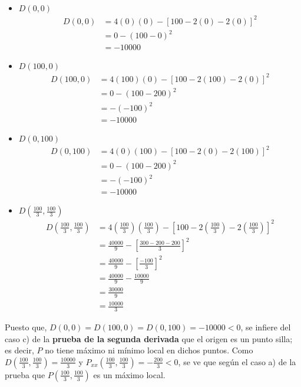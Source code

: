 \documentclass[12pt]{article}
\begin{document}
\begin{itemize}
  
\item $D(0,0)$
  \begin{align*}
    D(0,0)
    &= 4(0)(0)-[100-2(0)-2(0)]^2 \\
    &= 0 - (100-0)^2\\
    &= -10000
  \end{align*}
  
\item $D(100,0)$
  \begin{align*}
    D(100,0)
    &= 4(100)(0)-[100-2(100)-2(0)]^2 \\
    &= 0 - (100-200)^2\\
    &= -(-100)^2\\
    &= -10000
  \end{align*}
  
\item $D(0,100)$
  \begin{align*}
    D(0,100)
    &= 4(0)(100)-[100-2(0)-2(100)]^2 \\
    &= 0 - (100-200)^2\\
    &= -(-100)^2\\
    &= -10000
  \end{align*}
  
\item $D\left(\frac{100}{3},\frac{100}{3}\right)$
  \begin{align*}
    D\left(\frac{100}{3},\frac{100}{3}\right)
    &= 4\left(\frac{100}{3}\right)\left(\frac{100}{3}\right)-\left[100-2\left(\frac{100}{3}\right)-2\left(\frac{100}{3}\right)\right]^2 \\
    &= \frac{40000}{9} - \left[ \frac{300-200-200}{3} \right]^2\\
    &= \frac{40000}{9} - \left[ \frac{-100}{3} \right]^2\\
    &= \frac{40000}{9} - \frac{10000}{9}\\
    &= \frac{30000}{9} \\
    &= \frac{10000}{3}
  \end{align*}
  
\end{itemize}

Puesto que, $D(0,0)= D(100,0) = D(0,100) = -10000 < 0$, se infiere del caso c) de la \textbf{prueba de la segunda derivada} que el origen es un punto silla; es decir, $P$ no tiene máximo ni mínimo local en dichos puntos. Como $D\left(\frac{100}{3},\frac{100}{3}\right)=\frac{10000}{3}$ y $P_{xx}\left(\frac{100}{3},\frac{100}{3}\right)=-\frac{200}{3}<0$, se ve que según el caso a) de la prueba que $P\left(\frac{100}{3},\frac{100}{3}\right)$ es un máximo local. \\
\end{document}
